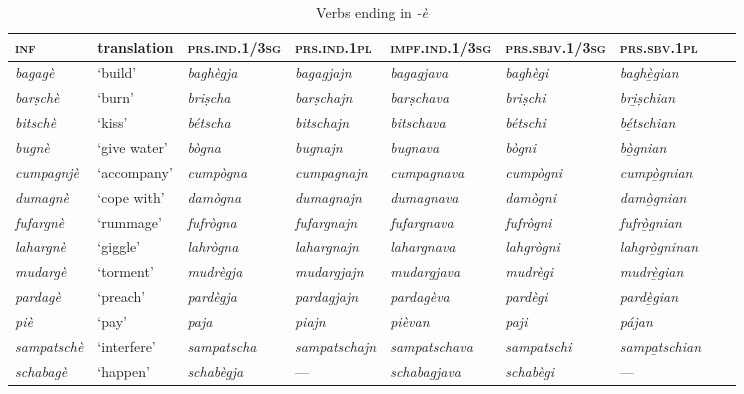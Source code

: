 \begin{sidewaystable} 
	\caption{Verbs ending in \textit{-è}}
	\label{stemalte}
	\begin{tabularx}{\textwidth}{lllllllll} 
		\lsptoprule
		\textsc{\textbf{inf}} & \textbf{translation} & \textsc{\textbf{prs.ind.1/3sg}} & \textsc{\textbf{prs.ind.1pl}} & \textsc{\textbf{impf.ind.1/3sg}} & \textsc{\textbf{prs.sbjv.1/3sg}} & \textsc{\textbf{prs.sbv.1pl}} \\
		\midrule
		\textit{bagagè} & ‘build’ & \textit{baghègja} & \textit{bagagjajn} & \textit{bagagjava} & \textit{baghègi} & \textit{baghè̱gian}\\
		\textit{barṣchè} & ‘burn’ & \textit{briṣcha} & \textit{barṣchajn} & \textit{barṣchava} & \textit{briṣchi} & \textit{bri̱ṣchian}\\
		\textit{bitschè} & ‘kiss’ & \textit{bétscha} & \textit{bitschajn} & \textit{bitschava} & \textit{bétschi} & \textit{bé̱tschian}\\
		\textit{bugnè} & ‘give water’ & \textit{bògna} & \textit{bugnajn} & \textit{bugnava} & \textit{bògni} & \textit{bò̱gnian}\\
		\textit{cumpagnjè} & ‘accompany’ & \textit{cumpògna} & \textit{cumpagnajn} & \textit{cumpagnava} & \textit{cumpògni} & \textit{cumpò̱gnian}\\
		\textit{dumagnè} & `cope with' & \textit{damògna} & \textit{dumagnajn} & \textit{dumagnava} & \textit{damògni} & \textit{damò̱gnian}\\
		\textit{fufargnè} & ‘rummage’ & \textit{fufrògna} & \textit{fufargnajn} & \textit{fufargnava} & \textit{fufrògni} & \textit{fufrò̱gnian}\\
		\textit{lahargnè} & `giggle' & \textit{lahrògna} & \textit{lahargnajn}& \textit{lahargnava} & \textit{lahgrògni} & \textit{lahgrò̱gninan}\\
		\textit{mudargè} & `torment' & \textit{mudrègja} & \textit{mudargjajn} & \textit{mudargjava} & \textit{mudrègi} & \textit{mudrè̱gian} \\
		\textit{pardagè} & ‘preach’ & \textit{pardègja} & \textit{pardagjajn} & \textit{pardagèva} & \textit{pardègi} & \textit{pardè̱gian}\\
		\textit{piè} & ‘pay’ & \textit{paja} & \textit{piajn} & \textit{pièvan} & \textit{paji} & \textit{pájan}\\
		\textit{sampatschè} & ‘interfere’ & \textit{sampatscha} & \textit{sampatschajn} & \textit{sampatschava} & \textit{sampatschi} & \textit{sampa̱tschian}\\
		\textit{schabagè} & `happen' & \textit{schabègja} & --- & \textit{schabagjava} & \textit{schabègi} &  ---\\

\end{tabularx}
\end{sidewaystable}
